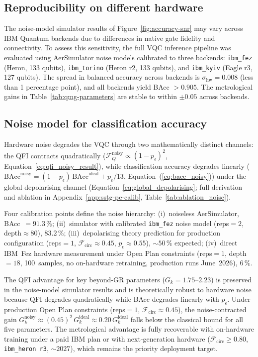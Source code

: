 \documentclass[11pt,a4paper, english]{book}
\theoremstyle{plain}
\theoremstyle{definition}
\numberwithin{equation}{chapter}
\numberwithin{figure}{chapter}
\numberwithin{table}{chapter}
\begin{document}
\subsection{Reproducibility on different hardware}
\label{subsec:hw-reproducibility}

The noise-model simulator results of Figure~\ref{fig:accuracy-snr}
may vary across IBM Quantum backends due to differences in native
gate fidelity and connectivity. To assess this sensitivity,
the full VQC inference pipeline was evaluated using AerSimulator
noise models calibrated to three backends: \texttt{ibm\_fez} (Heron, 133 qubits),
\texttt{ibm\_torino} (Heron r2, 133 qubits), and \texttt{ibm\_kyiv}
(Eagle r3, 127 qubits).  The spread in balanced accuracy across backends
is $\sigma_\mathrm{hw} = 0.008$ (less than 1 percentage point), and
all backends yield BAcc $> 0.905$.  The metrological gains in
Table~\ref{tab:qmg-parameters} are stable to within $\pm 0.05$ across
backends.

\subsection{Noise model for classification accuracy}
\label{subsec:noise-model-accuracy}

Hardware noise degrades the VQC through two mathematically distinct channels: the QFI
contracts quadratically ($\mathcal{F}_Q^\text{noisy} \propto (1-p_\epsilon)^2$,
Equation~\ref{eq:qfi_noisy_result}), while classification accuracy degrades linearly
($\text{BAcc}^\text{noisy} = (1-p_\epsilon)\,\text{BAcc}^\text{ideal} + p_\epsilon/13$,
Equation~(\ref{eq:bacc_noisy})) under the global depolarising channel
(Equation~\ref{eq:global_depolarising}; full derivation and
ablation in Appendix~\ref{app:sstg-pe-calib}, Table~\ref{tab:ablation_noise}).

Four calibration points define the noise hierarchy:
(i)~noiseless AerSimulator, BAcc~$= 91.3\,\%$;
(ii)~simulator with calibrated \texttt{ibm\_fez} noise model
(reps$=2$, depth$\approx80$), $83.2\,\%$;
(iii)~depolarising theory prediction for production configuration
(reps$=1$, $\mathcal{F}_\mathrm{circ}\approx0.45$,
$p_\epsilon\approx0.55$), ${\sim}50\,\%$ expected;
(iv)~direct IBM~Fez hardware measurement under Open Plan constraints
(reps$=1$, depth$=18$, 100~samples, no on-hardware retraining,
production runs June~2026), $6\,\%$.


The QFI advantage for key beyond-GR parameters ($G_k = 1.75$--$2.23$)
is preserved in the noise-model simulator results and is theoretically
robust to hardware noise because QFI degrades quadratically while BAcc
degrades linearly with $p_\epsilon$.
Under production Open Plan constraints (reps$=1$,
$\mathcal{F}_\mathrm{circ}\approx0.45$), the noise-contracted gain
$G_k^\mathrm{noisy}\approx(0.45)^2\,G_k^\mathrm{ideal}\approx0.20\,G_k^\mathrm{ideal}$
falls below the classical bound for all five parameters.
The metrological advantage is fully recoverable with on-hardware
training under a paid IBM plan or with next-generation hardware
($\mathcal{F}_\mathrm{circ}\geq0.80$, \texttt{ibm\_heron~r3},
${\sim}2027$), which remains the priority deployment target.
\end{document}
